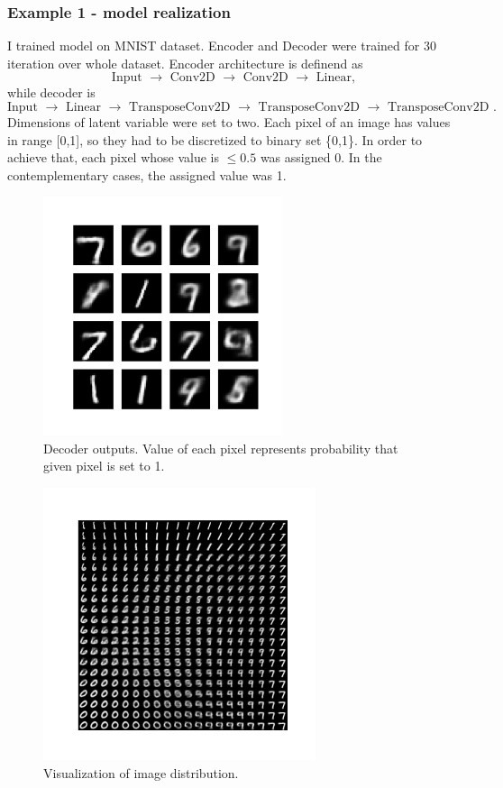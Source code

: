 \documentclass[10pt]{article}
\begin{document}
\subsubsection{Example 1 - model realization}
I trained model on MNIST dataset. Encoder and Decoder were trained for 30 iteration over whole dataset.
Encoder architecture is definend as
\begin{displaymath}
    \text{Input $\to$ Conv2D $\to$ Conv2D $\to$ Linear},
\end{displaymath}
while decoder is
\begin{displaymath}
    \text{Input $\to$ Linear $\to$ TransposeConv2D $\to$ TransposeConv2D $\to$  TransposeConv2D }.
\end{displaymath}
Dimensions of latent variable were set to two. Each pixel of an image has values in range [0,1], so they had to be discretized to binary set  \{0,1\}. In order to achieve that, each pixel whose value is  $ \leq 0.5$ was assigned 0. In the contemplementary cases, the assigned value was 1.
\begin{figure}[H]

    \centering
    \includegraphics[width = 7cm, height = 7cm]{image_at_epoch_0029.png}
    \caption[Decoder outputs.]
    {Decoder outputs. Value of each pixel represents probability that given pixel is set to 1.}
\end{figure}

\begin{figure}
    \centering
    \includegraphics[width = 8cm, height = 8cm]{manifold_vae_bernoulli.png}
    \caption{Visualization of image distribution.}
\end{figure}
\end{document}
